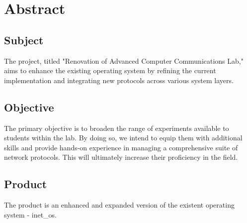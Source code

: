 \chapter{Abstract}

\section*{Subject}
The project, titled "Renovation of Advanced Computer Communications Lab," aims to enhance the existing operating system by refining the current implementation and integrating new protocols across various system layers.

\section*{Objective}
The primary objective is to broaden the range of experiments available to students within the lab. By doing so, we intend to equip them with additional skills and provide hands-on experience in managing a comprehensive suite of network protocols. This will ultimately increase their proficiency in the field.

\section*{Product}
The product is an enhanced and expanded version of the existent operating system - inet\_os.